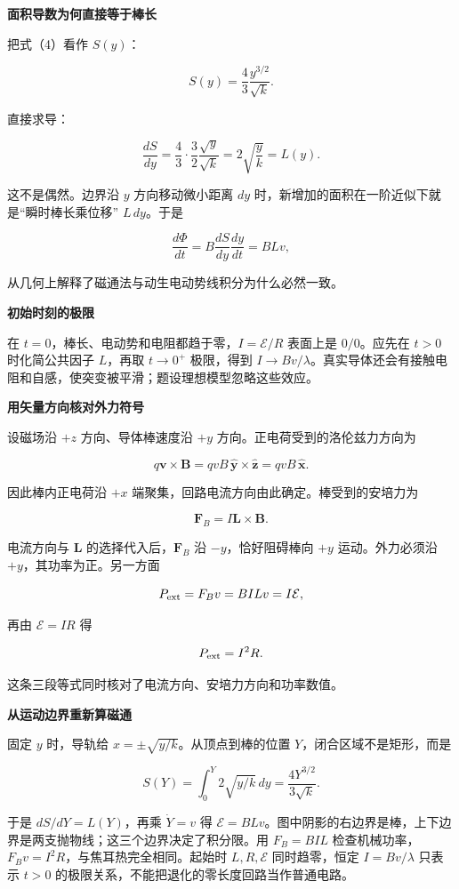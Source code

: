\documentclass[12pt,a4paper,UTF8]{ctexart}
\begin{document}
\textbf{面积导数为何直接等于棒长}

把式（4）看作 \(S(y)\)：

\[
S(y)=\frac43\frac{y^{3/2}}{\sqrt k}.
\]

直接求导：

\[
\frac{dS}{dy}
=\frac43\cdot\frac32\frac{\sqrt y}{\sqrt k}
=2\sqrt{\frac yk}
=L(y).
\]

这不是偶然。边界沿 \(y\) 方向移动微小距离 \(dy\)
时，新增加的面积在一阶近似下就是``瞬时棒长乘位移'' \(L\,dy\)。于是

\[
\frac{d\Phi}{dt}
=B\frac{dS}{dy}\frac{dy}{dt}
=BLv,
\]

从几何上解释了磁通法与动生电动势线积分为什么必然一致。

\textbf{初始时刻的极限}

在 \(t=0\)，棒长、电动势和电阻都趋于零，\(I=\mathcal E/R\) 表面上是
\(0/0\)。应先在 \(t>0\) 时化简公共因子 \(L\)，再取 \(t\to0^+\)
极限，得到
\(I\to Bv/\lambda\)。真实导体还会有接触电阻和自感，使突变被平滑；题设理想模型忽略这些效应。

\textbf{用矢量方向核对外力符号}

设磁场沿 \(+z\) 方向、导体棒速度沿 \(+y\)
方向。正电荷受到的洛伦兹力方向为

\[
q\bm v\times\bm B
=qvB\,\hat{\bm y}\times\hat{\bm z}
=qvB\,\hat{\bm x}.
\]

因此棒内正电荷沿 \(+x\) 端聚集，回路电流方向由此确定。棒受到的安培力为

\[
\bm F_B=I\bm L\times\bm B.
\]

电流方向与 \(\bm L\) 的选择代入后，\(\bm F_B\) 沿 \(-y\)，恰好阻碍棒向
\(+y\) 运动。外力必须沿 \(+y\)，其功率为正。另一方面

\[
P_{\rm ext}=F_Bv=BILv=I\mathcal E,
\]

再由 \(\mathcal E=IR\) 得

\[
P_{\rm ext}=I^2R.
\]

这条三段等式同时核对了电流方向、安培力方向和功率数值。

\textbf{从运动边界重新算磁通}

固定 \(y\) 时，导轨给 \(x=\pm\sqrt{y/k}\)。从顶点到棒的位置
\(Y\)，闭合区域不是矩形，而是

\[S(Y)=\int_0^Y2\sqrt{y/k}\,dy=\frac{4Y^{3/2}}{3\sqrt k}.\]

于是 \(dS/dY=L(Y)\)，再乘 \(\dot Y=v\) 得
\(\mathcal E=BLv\)。图中阴影的右边界是棒，上下边界是两支抛物线；这三个边界决定了积分限。用
\(F_B=BIL\) 检查机械功率，\(F_Bv=I^2R\)，与焦耳热完全相同。起始时
\(L,R,\mathcal E\) 同时趋零，恒定 \(I=Bv/\lambda\) 只表示 \(t>0\)
的极限关系，不能把退化的零长度回路当作普通电路。
\end{document}
